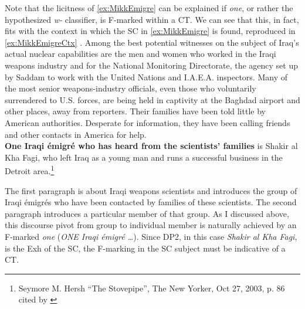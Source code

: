 \documentclass[
	letterpaper,
]{article}
\begin{document}
Note that the licitness of \ref{ex:MikkEmigre} can be explained if \textit{one}, or rather the hypothesized \textit{w-} classifier, is F-marked within a CT.
We can see that this, in fact, fits with the context in which the SC in \ref{ex:MikkEmigre} is found, reproduced in \ref{ex:MikkEmigreCtx}
\ex.\label{ex:MikkEmigreCtx} {
	Among the best potential witnesses on the subject of Iraq’s actual nuclear capabilities are the men and women who worked in the Iraqi weapons industry and for the National Monitoring Directorate, the agency set up by Saddam to work with the United Nations and I.A.E.A. inspectors.
	Many of the most senior weapons-industry officials, even those who voluntarily surrendered to U.S. forces, are being held in captivity at the Baghdad airport and other places, away from reporters. Their families have been told little by American authorities.
	Desperate for information, they have been calling friends and other contacts in America for help.\\
\hspace{2em}\textbf{One Iraqi \'emigr\'e who has heard from the scientists' families} is Shakir al Kha Fagi, who left Iraq as a young man and runs a successful business in the Detroit area.\footnote{Seymore M. Hersh ``The Stovepipe'', The New Yorker, Oct 27, 2003, p. 86 cited by \textcite[118]{mikkelsen2005copular}}}

The first paragraph is about Iraqi weapons scientists and introduces the group of Iraqi \'emigr\'es who have been contacted by families of these scientists.
The second paragraph introduces a particular member of that group.
As I discussed above, this discourse pivot from group to individual member is naturally achieved by an F-marked \textit{one} (\textit{ONE Iraqi \'emigr\'e \ldots}).
Since DP2, in this case \textit{Shakir al Kha Fagi}, is the Exh of the SC, the F-marking in the SC subject must be indicative of a CT.
\end{document}
